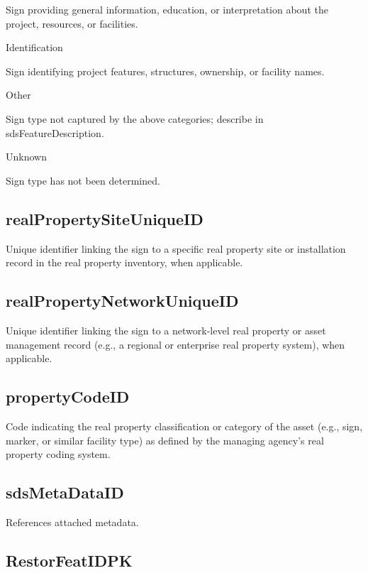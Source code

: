 \documentclass[
  letterpaper,
  DIV=11,
  numbers=noendperiod]{scrreprt}
\begin{document}
Sign providing general information, education, or interpretation about
the project, resources, or facilities.

Identification

Sign identifying project features, structures, ownership, or facility
names.

Other

Sign type not captured by the above categories; describe in
sdsFeatureDescription.

Unknown

Sign type has not been determined.

\subsection{realPropertySiteUniqueID}\label{realpropertysiteuniqueid-3}

Unique identifier linking the sign to a specific real property site or
installation record in the real property inventory, when applicable.

\subsection{realPropertyNetworkUniqueID}\label{realpropertynetworkuniqueid-3}

Unique identifier linking the sign to a network-level real property or
asset management record (e.g., a regional or enterprise real property
system), when applicable.

\subsection{propertyCodeID}\label{propertycodeid-3}

Code indicating the real property classification or category of the
asset (e.g., sign, marker, or similar facility type) as defined by the
managing agency's real property coding system.

\subsection{sdsMetaDataID}\label{sdsmetadataid-24}

References attached metadata.

\subsection{RestorFeatIDPK}\label{restorfeatidpk-24}
\end{document}
